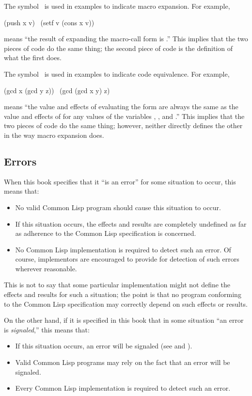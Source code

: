The symbol \EX\ is used in examples to indicate macro expansion.
For example,
\begin{lisp}
(push x v) \EX\ (setf v (cons x v))
\end{lisp}
means ``the result of expanding the macro-call form 
is .''  This implies that the two pieces
of code do the same thing; the second piece of code is
the definition of what the first does.

The symbol \EQ\ is used in examples to indicate code equivalence.
For example,
\begin{lisp}
(gcd x (gcd y z)) \EQ\ (gcd (gcd x y) z)
\end{lisp}
means ``the value and effects of evaluating the form
 are always the same as the value
and effects of
 for any values of the
variables , , and .''
This implies that the two pieces
of code do the same thing; however, neither directly defines
the other in the way macro expansion does.

\subsection{Errors}
\label{INTRO-ERRORS}

When this book specifies that it ``is an error'' for some situation
to occur, this means that:
\begin{itemize}
\item No valid Common Lisp program should cause this situation to occur.

\item If this situation occurs, the effects and results are completely
undefined as far as adherence to the Common Lisp specification is concerned.

\item No Common Lisp implementation is required to detect such an error.
Of course, implementors are encouraged to provide for detection
of such errors wherever reasonable.
\end{itemize}
This is not to say that some particular implementation might not define
the effects and results for such a situation; the point is that no program
conforming to the Common Lisp specification may correctly depend on such
effects or results.

On the other hand, if it is specified in this book that in some situation
``an error is {\it signaled},'' this means that:
\begin{itemize}
\item If this situation occurs, an error will be signaled
(see  and ).

\item Valid Common Lisp programs may rely on the fact that an error will be signaled.

\item Every Common Lisp implementation is required to detect such an error.
\end{itemize}

